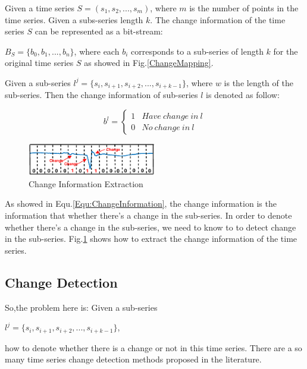 Given a time series $S = (s_1,s_2,...,s_m)$, where $m$ is the number of points in the time series. Given a subs-series length $k$. The change information of the time series $S$ can be represented as a bit-stream:

$B_S = \{b_0,b_1,...,b_n\}$, where each $b_i$ corresponds to a sub-series of length $k$ for the original time series $S$ as showed in Fig.\ref{ChangeMapping}.

Given a sub-series $l^j = \{s_i,s_{i+1},s_{i+2},...,s_{i+k-1}\}$, where $w$ is the length of the sub-series. Then the change information of sub-series $l$ is denoted as follow:

\begin{equation}
\label{Equ:ChangeInformation}
b^l = \left\{\begin{matrix}
1 & Have~change~in~l
\\ 
0 & No~change~in~l
\end{matrix}\right.
\end{equation}

\begin{figure}[t]
\centering
\includegraphics[width=0.5\textwidth]{changeExtraction.eps}
\caption{Change Information Extraction}
\label{fig:ChangeMapping}
\end{figure}

As showed in Equ.\ref{Equ:ChangeInformation}, the change information is the information that whether there's a change in the sub-series. In order to denote whether there's a change in the sub-series, we need to know to to detect change in the sub-series.
Fig.\ref{fig:ChangeMapping} shows how to extract the change information of the time series.

\subsection{Change Detection}

So,the problem here is:
Given a sub-series 

$l^j = \{s_i,s_{i+1},s_{i+2},...,s_{i+k-1}\}$, 

how to denote whether there is a change or not in this time series.
There are a so many time series change detection methods \cite{liu2013change,chen2013contextual} proposed in the literature. 

